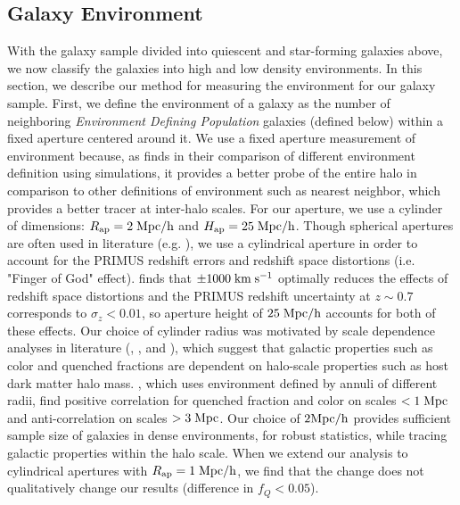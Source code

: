 \documentclass{emulateapj}
\begin{document}
\subsection{Galaxy Environment} \label{sec:environment}
With the galaxy sample divided into quiescent and star-forming galaxies above, we now classify the galaxies into high and low density environments. In this section, we describe our method for measuring the environment for our galaxy sample. First, we define the environment of a galaxy as the number of neighboring {\em Environment Defining Population} galaxies (defined below) within a fixed aperture centered around it. We use a fixed aperture measurement of environment because, as \cite{Muldrew:2012aa} finds in their comparison of different environment definition using simulations, it provides a better probe of the entire halo in comparison to other definitions of environment such as nearest neighbor, which provides a better tracer at inter-halo scales. For our aperture, we use a cylinder of dimensions: $R_{\rm{ap}} = 2 \; \rm{Mpc}/h$ and $H_{\rm{ap}} = 25 \; \rm{Mpc}/h$. Though spherical apertures are often used in literature (e.g. \cite{Croton:2005aa}), we use a cylindrical aperture in order to account for the PRIMUS redshift errors and redshift space distortions (i.e. "Finger of God" effect). \cite{Cooper:2005aa} finds that $\pm 1000 \; \rm{km} \; \rm{s^{-1}}$ optimally reduces the effects of redshift space distortions and the PRIMUS redshift uncertainty at $z \sim 0.7$ corresponds to $\sigma_z < 0.01$, so aperture height of $25 \; \rm{Mpc}/h$ accounts for both of these effects. Our choice of cylinder radius was motivated by scale dependence analyses in literature (\cite{Blanton:2006aa}, \cite{Wilman:2010aa}, and \cite{Muldrew:2012aa}), which suggest that galactic properties such as color and quenched fractions are dependent on halo-scale properties such as host dark matter halo mass. \cite{Wilman:2010aa}, which uses environment defined by annuli of different radii, find positive correlation for quenched fraction and color on scales $< 1 \; \rm{Mpc}$ and anti-correlation on scales $> 3 \; \rm{Mpc}$. Our choice of $2 \rm{Mpc}/h$ provides sufficient sample size of galaxies in dense environments, for robust statistics, while tracing galactic properties within the halo scale. When we extend our analysis to cylindrical apertures with $R_{\rm{ap}} = 1 \; \rm{Mpc}/h$, we find that the change does not qualitatively change our results (difference in $f_{Q} < 0.05$). 
\end{document}
